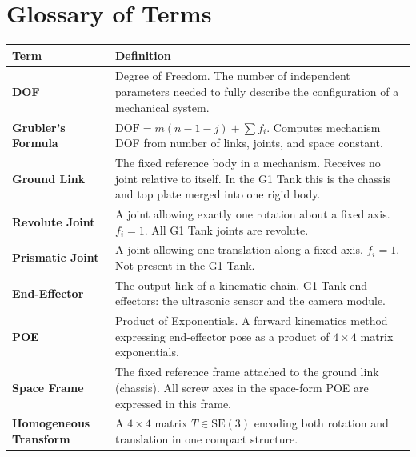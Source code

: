 \documentclass[12pt,a4paper]{article}
\begin{document}
\newpage
\section{Glossary of Terms}

\begin{longtable}{L{3.5cm} L{10cm}}
\toprule
{}
\color{white}\textbf{Term} & \color{white}\textbf{Definition} \\
\midrule
\endhead
\bottomrule
\endfoot

\textbf{DOF} &
  Degree of Freedom. The number of independent parameters needed to fully
  describe the configuration of a mechanical system. \\[4pt]

\textbf{Grubler's Formula} &
  $\mathrm{DOF}=m(n-1-j)+\sum f_i$. Computes mechanism DOF from number of
  links, joints, and space constant. \\[4pt]

\textbf{Ground Link} &
  The fixed reference body in a mechanism. Receives no joint relative to itself.
  In the G1 Tank this is the chassis and top plate merged into one rigid body. \\[4pt]

\textbf{Revolute Joint} &
  A joint allowing exactly one rotation about a fixed axis. $f_i=1$.
  All G1 Tank joints are revolute. \\[4pt]

\textbf{Prismatic Joint} &
  A joint allowing one translation along a fixed axis. $f_i=1$.
  Not present in the G1 Tank. \\[4pt]

\textbf{End-Effector} &
  The output link of a kinematic chain. G1 Tank end-effectors: the ultrasonic
  sensor and the camera module. \\[4pt]

\textbf{POE} &
  Product of Exponentials. A forward kinematics method expressing end-effector
  pose as a product of $4\times4$ matrix exponentials. \\[4pt]

\textbf{Space Frame} &
  The fixed reference frame attached to the ground link (chassis). All screw
  axes in the space-form POE are expressed in this frame. \\[4pt]

\textbf{Homogeneous Transform} &
  A $4\times4$ matrix $T\in\mathrm{SE}(3)$ encoding both rotation and
  translation in one compact structure. \\[4pt]


\end{longtable}
\end{document}
